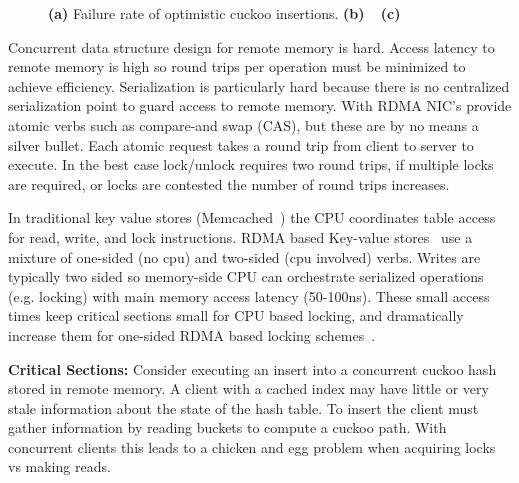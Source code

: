 \begin{figure}[t]
\begin{subfigure}{0.3\linewidth}
    \end{subfigure}
    \vspace{-1em}
    \caption{
    \textbf{(a)} Failure rate of optimistic cuckoo insertions.
    \textbf{(b)} ~
    \textbf{(c)} ~
    }
    \label{fig:problems}
\end{figure}

Concurrent data structure design for remote memory is hard.
Access latency to remote memory is high so round trips per
operation must be minimized to achieve efficiency.
Serialization is particularly hard because there is no
centralized serialization point to guard access to remote
memory. With RDMA NIC's provide atomic verbs such as
compare-and swap (CAS), but these are by no means a silver
bullet.  Each atomic request takes a round trip from client
to server to execute. In the best case lock/unlock requires
two round trips, if multiple locks are required, or locks
are contested the number of round trips increases.

In traditional key value stores (Memcached~\cite{memcached})
the CPU coordinates table access for read, write, and lock
instructions. RDMA based Key-value
stores~\cite{herd,erpc,pilaf} use a mixture of one-sided (no
cpu) and two-sided (cpu involved) verbs.  Writes are
typically two sided so memory-side CPU can orchestrate
serialized operations (e.g. locking) with main memory access
latency (50-100ns). These small access times keep critical
sections small for CPU based locking, and dramatically
increase them for one-sided RDMA based locking
schemes~\cite{clover, sherman}.

\textbf{Critical Sections:} Consider executing an insert
into a concurrent cuckoo hash stored in remote memory. A
client with a cached index may have little or very stale
information about the state of the hash table. To insert the
client must gather information by reading buckets to compute
a cuckoo path. With concurrent clients this leads to a
chicken and egg problem when acquiring locks vs making
reads.

